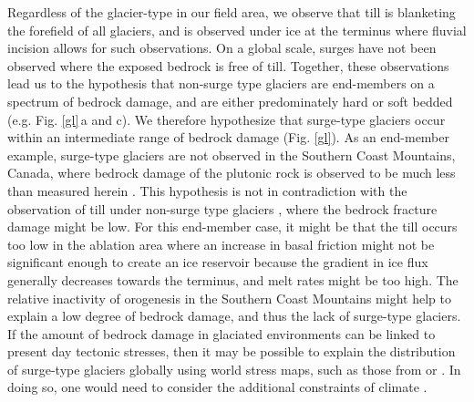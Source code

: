 \documentclass[review]{igs}
\begin{document}
Regardless of the glacier-type in our field area, we observe that till is blanketing the forefield of all glaciers, and is observed under ice at the terminus where fluvial incision allows for such observations. On a global scale, surges have not been observed where the exposed bedrock is free of till. Together, these observations lead us to the hypothesis that non-surge type glaciers are end-members on a spectrum of bedrock damage, and are either predominately hard or soft bedded (e.g. Fig. \ref{gl}\,a and c). We therefore hypothesize that surge-type glaciers occur within an intermediate range of bedrock damage (Fig. \ref{gl}). As an end-member example, surge-type glaciers are not observed in the Southern Coast Mountains, Canada, where bedrock damage of the plutonic rock is observed to be much less than measured herein \citep[e.g.][]{Sturzenegger2011}. This hypothesis is not in contradiction with the observation of till under non-surge type glaciers \citep[e.g.][]{Fischer2001,Iverson1994,Mair2003}, where the bedrock fracture damage might be low. For this end-member case, it might be that the till occurs too low in the ablation area where an increase in basal friction might not be significant enough to create an ice reservoir because the gradient in ice flux generally decreases towards the terminus, and melt rates might be too high. The relative inactivity of orogenesis in the Southern Coast Mountains \citep{Parrish1983} might help to explain a low degree of bedrock damage, and thus the lack of surge-type glaciers. If the amount of bedrock damage in glaciated environments can be linked to present day tectonic stresses, then it may be possible to explain the distribution of surge-type glaciers globally using world stress maps, such as those from \cite{Zoback1992} or \cite{Heidbach2010}. In doing so, one would need to consider the additional constraints of climate \citep{Sevestre2015}. 
\end{document}
